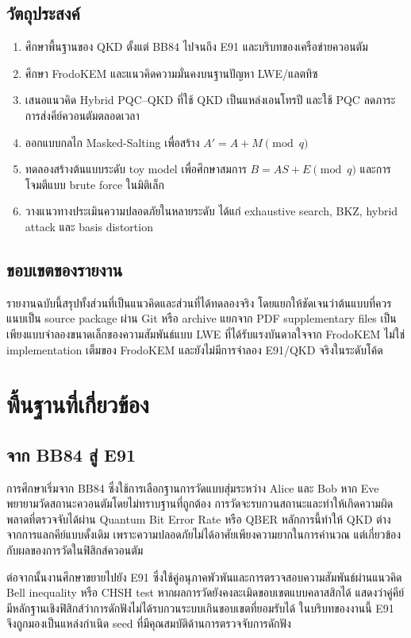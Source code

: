 \documentclass[14pt,a4paper]{extarticle}
\newcommand{\eng}[1]{\textenglish{#1}}
\begin{document}
\subsection{วัตถุประสงค์}
\begin{enumerate}
    \item ศึกษาพื้นฐานของ QKD ตั้งแต่ BB84 ไปจนถึง E91 และบริบทของเครือข่ายควอนตัม
    \item ศึกษา FrodoKEM และแนวคิดความมั่นคงบนฐานปัญหา LWE/แลตทิซ
    \item เสนอแนวคิด \eng{Hybrid PQC--QKD} ที่ใช้ QKD เป็นแหล่งเอนโทรปี และใช้ PQC ลดภาระการส่งคีย์ควอนตัมตลอดเวลา
    \item ออกแบบกลไก \eng{Masked-Salting} เพื่อสร้าง $A' = A + M \pmod q$
    \item ทดลองสร้างต้นแบบระดับ \eng{toy model} เพื่อศึกษาสมการ $B = AS + E \pmod q$ และการโจมตีแบบ brute force ในมิติเล็ก
    \item วางแนวทางประเมินความปลอดภัยในหลายระดับ ได้แก่ exhaustive search, BKZ, hybrid attack และ basis distortion
\end{enumerate}

\subsection{ขอบเขตของรายงาน}
รายงานฉบับนี้สรุปทั้งส่วนที่เป็นแนวคิดและส่วนที่ได้ทดลองจริง โดยแยกให้ชัดเจนว่าต้นแบบที่ควรแนบเป็น source package ผ่าน Git หรือ archive แยกจาก PDF supplementary files เป็นเพียงแบบจำลองขนาดเล็กของความสัมพันธ์แบบ LWE ที่ได้รับแรงบันดาลใจจาก FrodoKEM ไม่ใช่ implementation เต็มของ FrodoKEM และยังไม่มีการจำลอง E91/QKD จริงในระดับโค้ด

\section{พื้นฐานที่เกี่ยวข้อง}
\subsection{จาก BB84 สู่ E91}
การศึกษาเริ่มจาก BB84 ซึ่งใช้การเลือกฐานการวัดแบบสุ่มระหว่าง Alice และ Bob หาก Eve พยายามวัดสถานะควอนตัมโดยไม่ทราบฐานที่ถูกต้อง การวัดจะรบกวนสถานะและทำให้เกิดความผิดพลาดที่ตรวจจับได้ผ่าน \eng{Quantum Bit Error Rate} หรือ QBER หลักการนี้ทำให้ QKD ต่างจากการแลกคีย์แบบดั้งเดิม เพราะความปลอดภัยไม่ได้อาศัยเพียงความยากในการคำนวณ แต่เกี่ยวข้องกับผลของการวัดในฟิสิกส์ควอนตัม

ต่อจากนั้นงานศึกษาขยายไปยัง E91 ซึ่งใช้คู่อนุภาคพัวพันและการตรวจสอบความสัมพันธ์ผ่านแนวคิด \eng{Bell inequality} หรือ \eng{CHSH test} หากผลการวัดยังคงละเมิดขอบเขตแบบคลาสสิกได้ แสดงว่าคู่คีย์มีหลักฐานเชิงฟิสิกส์ว่าการดักฟังไม่ได้รบกวนระบบเกินขอบเขตที่ยอมรับได้ ในบริบทของงานนี้ E91 จึงถูกมองเป็นแหล่งกำเนิด seed ที่มีคุณสมบัติด้านการตรวจจับการดักฟัง
\end{document}

